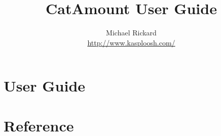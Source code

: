 \documentclass[12pt,letterpaper,oneside,openany]{book}
\begin{document}
\title{CatAmount User Guide}
\author{Michael Rickard\\
  \url{http://www.kasploosh.com/}}
\maketitle



\tableofcontents

\part{User Guide}













\part{Reference}








\appendix

\end{document}

